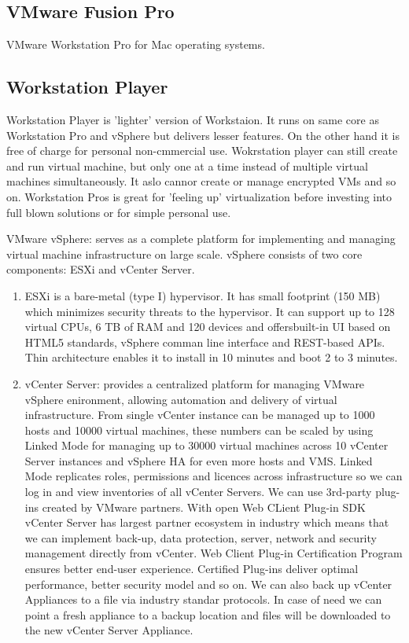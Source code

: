 \subsection{VMware Fusion Pro}
VMware Workstation Pro for Mac operating systems.

\subsection{Workstation Player}
Workstation Player is 'lighter' version of Workstaion. It runs on same core as Workstation Pro and vSphere but delivers lesser features. On the other hand it is free of charge for personal non-cmmercial use. Wokrstation player can still create and run virtual machine, but only one at a time instead of multiple virtual machines simultaneously. It aslo cannor create or manage encrypted VMs and so on. Workstation Pros is great for 'feeling up' virtualization before investing into full blown solutions or for simple personal use.
\item VMware vSphere: serves as a complete platform for implementing and managing virtual machine infrastructure on large scale. vSphere consists of two core components: ESXi and vCenter Server.
\begin{enumerate}
\item ESXi is a bare-metal (type I) hypervisor. It has small footprint (150 MB) which minimizes security threats to the hypervisor. It can support up to 128 virtual CPUs, 6 TB of RAM and 120 devices and offersbuilt-in UI based on HTML5 standards, vSphere comman line interface and REST-based APIs. Thin architecture enables it to install in 10 minutes and boot 2 to 3 minutes.
\item vCenter Server: provides a centralized platform for managing VMware vSphere enironment, allowing automation and delivery of virtual infrastructure. From single vCenter instance can be managed up to 1000 hosts and 10000 virtual machines, these numbers can be scaled by using Linked Mode for managing up to 30000 virtual machines across 10 vCenter Server instances and vSphere HA for even more hosts and VMS. Linked Mode replicates roles, permissions and licences across infrastructure so we can log in and view inventories of all vCenter Servers. We can use 3rd-party plug-ins created by VMware partners. With open Web CLient Plug-in SDK vCenter Server has largest partner ecosystem in industry which means that we can implement back-up, data protection, server, network and security management directly from vCenter. Web Client Plug-in Certification Program ensures better end-user experience. Certified Plug-ins deliver optimal performance, better security model and so on. We can also back up vCenter Appliances to a file via industry standar protocols. In case of need we can point a fresh appliance to a backup location and files will be downloaded to the new vCenter Server Appliance.
\end{enumerate}
